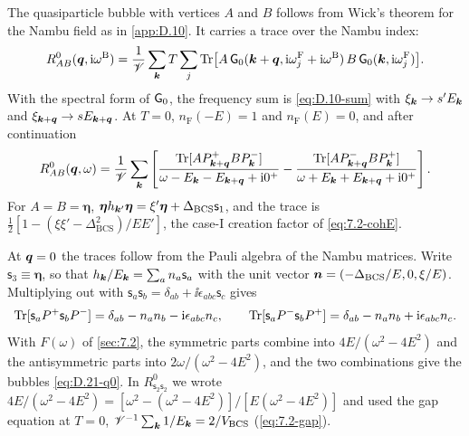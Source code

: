 The quasiparticle bubble with vertices $A$ and $B$ follows from Wick's theorem for the Nambu field as in \cref{app:D.10}. It carries a trace over the Nambu index:
\begin{equation*}
  R^0_{AB}(\bm{q},\mathrm{i}\omega^{\mathrm{B}}) = \frac1{\mathscr{V}}\sum_{\bm{k}}T\sum_{j}\operatorname{Tr}\bigl[A\,\mathsf{G}_0(\bm{k}+\bm{q},\mathrm{i}\omega^{\mathrm{F}}_j + \mathrm{i}\omega^{\mathrm{B}})\,B\,\mathsf{G}_0(\bm{k},\mathrm{i}\omega^{\mathrm{F}}_j)\bigr] .
\end{equation*}
With the spectral form of $\mathsf{G}_0$, the frequency sum is \cref{eq:D.10-sum} with $\xi_{\bm{k}} \to s'E_{\bm{k}}$ and $\xi_{\bm{k}+\bm{q}} \to sE_{\bm{k}+\bm{q}}$. At $T = 0$, $n_{\mathrm{F}}(-E) = 1$ and $n_{\mathrm{F}}(E) = 0$, and after continuation
\begin{equation}
  R^0_{AB}(\bm{q},\omega) = \frac1{\mathscr{V}}\sum_{\bm{k}}\left[\frac{\operatorname{Tr}[A P^+_{\bm{k}+\bm{q}}BP^-_{\bm{k}}]}{\omega - E_{\bm{k}} - E_{\bm{k}+\bm{q}} + \mathrm{i}0^+} - \frac{\operatorname{Tr}[A P^-_{\bm{k}+\bm{q}}BP^+_{\bm{k}}]}{\omega + E_{\bm{k}} + E_{\bm{k}+\bm{q}} + \mathrm{i}0^+}\right] .
  \label{eq:D.21-R0}
\end{equation}
For $A = B = \boldsymbol{\eta}$, $\boldsymbol{\eta}h_{\bm{k}'}\boldsymbol{\eta} = \xi'\boldsymbol{\eta} + \Delta_{\mathrm{BCS}}\mathsf{s}_1$, and the trace is $\frac12[1 - (\xi\xi' - \Delta_{\mathrm{BCS}}^2)/EE']$, the case-I creation factor of \cref{eq:7.2-cohE}.

At $\bm{q} = 0$ the traces follow from the Pauli algebra of the Nambu matrices. Write $\mathsf{s}_3 \equiv \boldsymbol{\eta}$, so that $h_{\bm{k}}/E_{\bm{k}} = \sum_an_a\mathsf{s}_a$ with the unit vector $\bm{n} = (-\Delta_{\mathrm{BCS}}/E, 0, \xi/E)$. Multiplying out with $\mathsf{s}_a\mathsf{s}_b = \delta_{ab} + \ii\epsilon_{abc}\mathsf{s}_c$ gives
\begin{equation*}
  \operatorname{Tr}[\mathsf{s}_aP^+\mathsf{s}_bP^-] = \delta_{ab} - n_an_b - \mathrm{i}\epsilon_{abc}n_c, \qquad \operatorname{Tr}[\mathsf{s}_aP^-\mathsf{s}_bP^+] = \delta_{ab} - n_an_b + \mathrm{i}\epsilon_{abc}n_c .
\end{equation*}
With $F(\omega)$ of \cref{sec:7.2}, the symmetric parts combine into $4E/(\omega^2 - 4E^2)$ and the antisymmetric parts into $2\omega/(\omega^2 - 4E^2)$, and the two combinations give the bubbles \cref{eq:D.21-q0}. In $R^0_{\mathsf{s}_2\mathsf{s}_2}$ we wrote $4E/(\omega^2 - 4E^2) = [\omega^2 - (\omega^2 - 4E^2)]/[E(\omega^2 - 4E^2)]$ and used the gap equation at $T = 0$, $\mathscr{V}^{-1}\sum_{\bm{k}}1/E_{\bm{k}} = 2/V_{\mathrm{BCS}}$ (\cref{eq:7.2-gap}).

